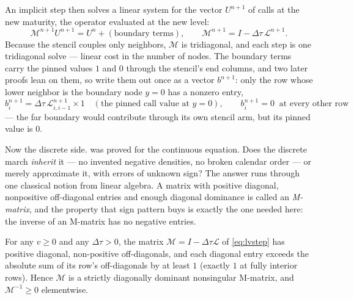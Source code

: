 An implicit step then solves a linear system for the vector $U^{n+1}$
of calls at the new maturity, the operator evaluated at the new level:
\begin{equation}
\mathcal M^{n+1}U^{n+1}=U^{n}+(\text{boundary terms}),
\qquad
\mathcal M^{n+1}=I-\Delta\tau\,\mathcal L^{n+1}.
\label{eq:lvstep}
\end{equation}
Because the stencil couples only neighbors, $\mathcal M$ is
tridiagonal, and each step is one tridiagonal solve --- linear cost in
the number of nodes.  The boundary terms carry the pinned values $1$
and $0$ through the stencil's end columns, and two later proofs lean
on them, so write them out once as a vector $b^{n+1}$: only the row
whose lower neighbor is the boundary node $y=0$ has a nonzero entry,
\[
b^{n+1}_i=\Delta\tau\,\mathcal L^{n+1}_{i,i-1}\times1
\quad(\text{the pinned call value at }y=0),
\qquad
b^{n+1}_i=0\ \text{ at every other row}
\]
--- the far boundary would contribute through its own stencil arm, but
its pinned value is $0$.

Now the discrete side.   was proved for
the continuous equation.  Does the discrete march \emph{inherit} it
--- no invented negative densities, no broken calendar order --- or
merely approximate it, with errors of unknown sign?  The answer runs
through one classical notion from linear algebra.  A matrix with
positive diagonal, nonpositive off-diagonal entries and enough
diagonal dominance is called an \emph{M-matrix}, and the property that
sign pattern buys is exactly the one needed here: the inverse of an
M-matrix has no negative entries.

\begin{proposition}
\label{prop:lvmmatrix}
For any $v\ge0$ and any $\Delta\tau>0$, the matrix
$\mathcal M=I-\Delta\tau\mathcal L$ of \eqref{eq:lvstep} has positive
diagonal, non-positive off-diagonals, and each diagonal entry exceeds the
absolute sum of its row's off-diagonals by at least $1$ (exactly $1$ at
fully interior rows).  Hence $\mathcal M$ is a strictly diagonally
dominant nonsingular M-matrix, and $\mathcal M^{-1}\ge0$ elementwise.
\end{proposition}

